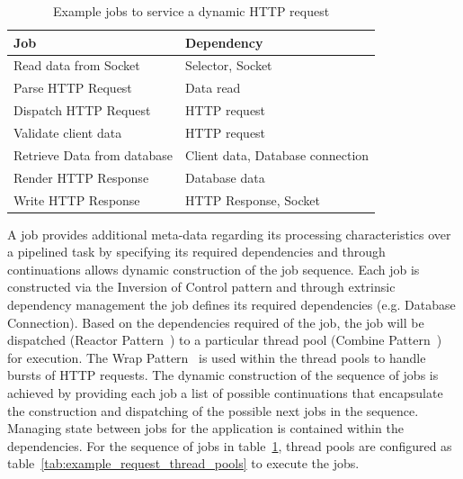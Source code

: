 \documentclass[conference]{ieee/IEEEtran}
\begin{document}
\begin{table}[!t]
\renewcommand{\arraystretch}{1.3}
\caption{Example jobs to service a dynamic HTTP request}
\label{tab:example_request_jobs}
\centering
\begin{tabular}{l||l}
\hline
\bfseries Job & \bfseries Dependency \\
\hline
\hline
Read data from Socket & Selector, Socket \\
\hline
Parse HTTP Request & Data read \\
\hline
Dispatch HTTP Request & HTTP request \\
\hline
Validate client data & HTTP request \\
\hline
Retrieve Data from database & Client data, Database connection \\
\hline
Render HTTP Response & Database data \\
\hline
Write HTTP Response & HTTP Response, Socket \\
\hline
\end{tabular}
\end{table}

A job provides additional meta-data regarding its processing characteristics
over a pipelined task by specifying its required dependencies and through
continuations allows dynamic construction of the job sequence.  Each job is
constructed via the Inversion of Control pattern and through extrinsic
dependency management \cite{ioc} the job defines its required dependencies (e.g.
Database Connection).  Based on the dependencies required of the job, the job
will be dispatched (Reactor Pattern~\cite{reactor}) to a particular thread pool
(Combine Pattern~\cite{pipeline}) for execution.  The Wrap
Pattern~\cite{pipeline} is used within the thread pools to handle bursts of HTTP
requests.  The dynamic construction of the sequence of jobs is achieved by
providing each job a list of possible continuations \cite{continuations} that
encapsulate the construction and dispatching of the possible next jobs in the
sequence. Managing state between jobs for the application is contained within
the dependencies.  For the sequence of jobs in
table~\ref{tab:example_request_jobs}, thread pools are configured as
table~\ref{tab:example_request_thread_pools} to execute the jobs.
\end{document}
